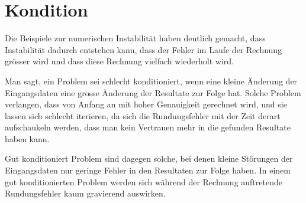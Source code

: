%
%
%
\section{Kondition
\label{buch:section:kondition}}
Die Beispiele zur numerischen Instabilität haben deutlich gemacht,
dass Instabilität dadurch entstehen kann, dass der Fehler im
Laufe der Rechnung grösser wird und dass diese Rechnung vielfach
wiederholt wird.

Man sagt, ein Problem sei schlecht konditioniert, wenn eine
kleine Änderung der Eingangsdaten eine grosse Änderung der Resultate
zur Folge hat.
Solche Problem verlangen, dass von Anfang an mit hoher Genauigkeit
gerechnet wird, und sie lassen sich schlecht iterieren, da sich
die Rundungsfehler mit der Zeit derart aufschaukeln werden, dass
man kein Vertrauen mehr in die gefunden Resultate haben kann.

Gut konditioniert Problem sind dagegen solche, bei denen kleine
Störungen der Eingangsdaten nur geringe Fehler in den Resultaten
zur Folge haben.
In einem gut konditionierten Problem werden sich während der
Rechnung auftretende Rundungsfehler kaum gravierend auswirken.





